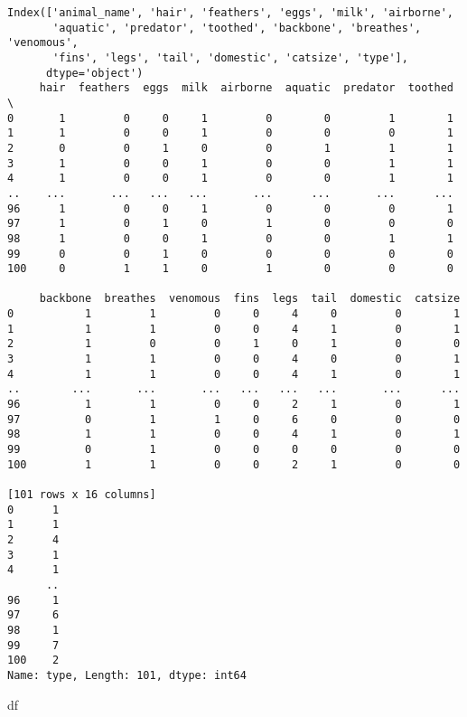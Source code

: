 \documentclass[
  letterpaper,
]{krantz}
\makeatletter
\newenvironment{Shaded}{\begin{snugshade}}{\end{snugshade}}
\newcommand{\NormalTok}[1]{\textcolor[rgb]{0.00,0.23,0.31}{#1}}
\newenvironment{kframe}{%
\medskip{}
\setlength{\fboxsep}{.8em}
 \def\at@end@of@kframe{}%
 \ifinner\ifhmode%
  \def\at@end@of@kframe{\end{minipage}}%
  \begin{minipage}{\columnwidth}%
 \fi\fi%
 \def\FrameCommand##1{\hskip\@totalleftmargin \hskip-\fboxsep
 \colorbox{shadecolor}{##1}\hskip-\fboxsep
     \hskip-\linewidth \hskip-\@totalleftmargin \hskip\columnwidth}%
 \MakeFramed {\advance\hsize-\width
   \@totalleftmargin\z@ \linewidth\hsize
   \@setminipage}}%
 {\par\unskip\endMakeFramed%
 \at@end@of@kframe}
\renewenvironment{Shaded}{\begin{kframe}}{\end{kframe}}
\makeatother
\begin{document}
\begin{verbatim}
Index(['animal_name', 'hair', 'feathers', 'eggs', 'milk', 'airborne',
       'aquatic', 'predator', 'toothed', 'backbone', 'breathes', 'venomous',
       'fins', 'legs', 'tail', 'domestic', 'catsize', 'type'],
      dtype='object')
     hair  feathers  eggs  milk  airborne  aquatic  predator  toothed  \
0       1         0     0     1         0        0         1        1   
1       1         0     0     1         0        0         0        1   
2       0         0     1     0         0        1         1        1   
3       1         0     0     1         0        0         1        1   
4       1         0     0     1         0        0         1        1   
..    ...       ...   ...   ...       ...      ...       ...      ...   
96      1         0     0     1         0        0         0        1   
97      1         0     1     0         1        0         0        0   
98      1         0     0     1         0        0         1        1   
99      0         0     1     0         0        0         0        0   
100     0         1     1     0         1        0         0        0   

     backbone  breathes  venomous  fins  legs  tail  domestic  catsize  
0           1         1         0     0     4     0         0        1  
1           1         1         0     0     4     1         0        1  
2           1         0         0     1     0     1         0        0  
3           1         1         0     0     4     0         0        1  
4           1         1         0     0     4     1         0        1  
..        ...       ...       ...   ...   ...   ...       ...      ...  
96          1         1         0     0     2     1         0        1  
97          0         1         1     0     6     0         0        0  
98          1         1         0     0     4     1         0        1  
99          0         1         0     0     0     0         0        0  
100         1         1         0     0     2     1         0        0  

[101 rows x 16 columns]
0      1
1      1
2      4
3      1
4      1
      ..
96     1
97     6
98     1
99     7
100    2
Name: type, Length: 101, dtype: int64
\end{verbatim}

\begin{Shaded}
\begin{Highlighting}[]
\NormalTok{df}
\end{Highlighting}
\end{Shaded}
\end{document}
